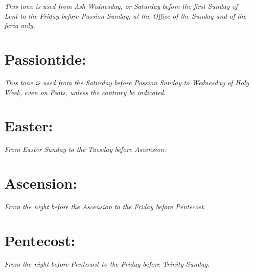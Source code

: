 \documentclass[a5paper,11pt,twoside,openany]{memoir}
\newcommand\rubrics[1]{\textit{#1}}
\begin{document}
\rubrics{This tone is used from Ash Wednesday, or Saturday before the first Sunday of Lent to the Friday before Passion Sunday, at the Office of the Sunday and of the feria only.}


\section{Passiontide:}

\rubrics{This tone is used from the Saturday before Passion Sunday to Wednesday of Holy Week, even on Feats, unless the contrary be indicated.}


\section{Easter:}

\rubrics{From Easter Sunday to the Tuesday before Ascension.}


\section{Ascension:}

\rubrics{From the night before the Ascension to the Friday before Pentecost.}


\section{Pentecost:}

\rubrics{From the night before Pentecost to the Friday before Trinity Sunday.}



\end{document}
